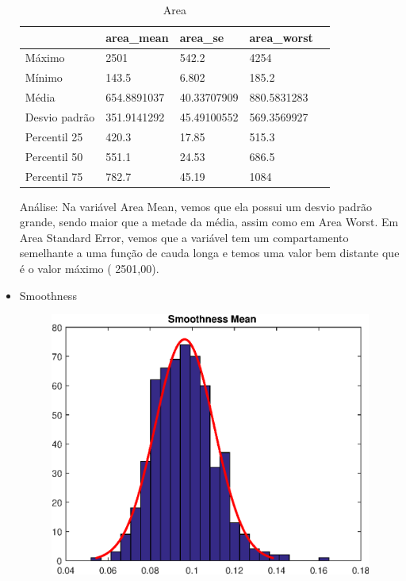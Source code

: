 \documentclass[11pt,a4paper]{article}
\numberwithin{equation}{section}
\begin{document}
\begin{itemize}
\begin{table}[H]
\centering
\caption{Area}
\label{my-label}
\begin{tabular}{lllll} \hline
              & area\_mean  & area\_se    & area\_worst &  \\ \hline
Máximo        & 2501        & 542.2       & 4254        &  \\
Mínimo        & 143.5       & 6.802       & 185.2       &  \\
Média         & 654.8891037 & 40.33707909 & 880.5831283 &  \\
Desvio padrão & 351.9141292 & 45.49100552 & 569.3569927 &  \\
Percentil 25  & 420.3       & 17.85       & 515.3       &  \\
Percentil 50  & 551.1       & 24.53       & 686.5       &  \\
Percentil 75  & 782.7       & 45.19       & 1084        &  \\ \hline
\end{tabular}
\end{table}

Análise: Na variável Area Mean, vemos que ela possui um desvio padrão grande, sendo maior que a metade da média, assim como em Area Worst. Em Area Standard Error, vemos que a variável tem um compartamento semelhante a uma função de cauda longa e temos uma valor bem distante que é o valor máximo ( 2501,00). 


\item Smoothness
\begin{figure}[H]
\centering
  \includegraphics[width=.4\linewidth]{./img/smoothness_mean}
  \label{fig:test1}
\end{figure}%


\end{itemize}
\end{document}
